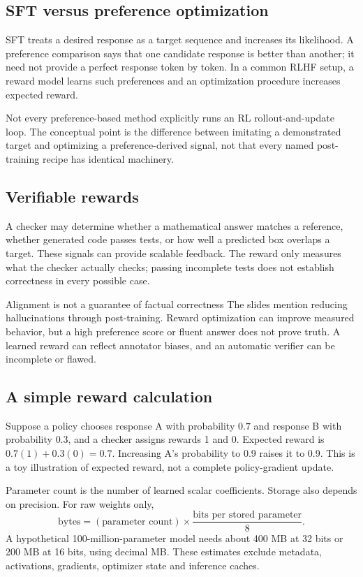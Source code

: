 \documentclass[11pt]{article}
\begin{document}
\subsection{SFT versus preference optimization}
SFT treats a desired response as a target sequence and increases its likelihood. A preference comparison says that one candidate response is better than another; it need not provide a perfect response token by token. In a common RLHF setup, a reward model learns such preferences and an optimization procedure increases expected reward.

Not every preference-based method explicitly runs an RL rollout-and-update loop. The conceptual point is the difference between imitating a demonstrated target and optimizing a preference-derived signal, not that every named post-training recipe has identical machinery.

\subsection{Verifiable rewards}
A checker may determine whether a mathematical answer matches a reference, whether generated code passes tests, or how well a predicted box overlaps a target. These signals can provide scalable feedback. The reward only measures what the checker actually checks; passing incomplete tests does not establish correctness in every possible case.

\begin{careful}{Alignment is not a guarantee of factual correctness}
The slides mention reducing hallucinations through post-training. Reward optimization can improve measured behavior, but a high preference score or fluent answer does not prove truth. A learned reward can reflect annotator biases, and an automatic verifier can be incomplete or flawed.
\end{careful}

\subsection{A simple reward calculation}
Suppose a policy chooses response A with probability $0.7$ and response B with probability $0.3$, and a checker assigns rewards 1 and 0. Expected reward is $0.7(1)+0.3(0)=0.7$. Increasing A's probability to 0.9 raises it to 0.9. This is a toy illustration of expected reward, not a complete policy-gradient update.

Parameter count is the number of learned scalar coefficients. Storage also depends on precision. For raw weights only,
\[
\text{bytes}=(\text{parameter count})\times
\frac{\text{bits per stored parameter}}{8}.
\]
A hypothetical 100-million-parameter model needs about 400 MB at 32 bits or 200 MB at 16 bits, using decimal MB. These estimates exclude metadata, activations, gradients, optimizer state and inference caches.
\end{document}
